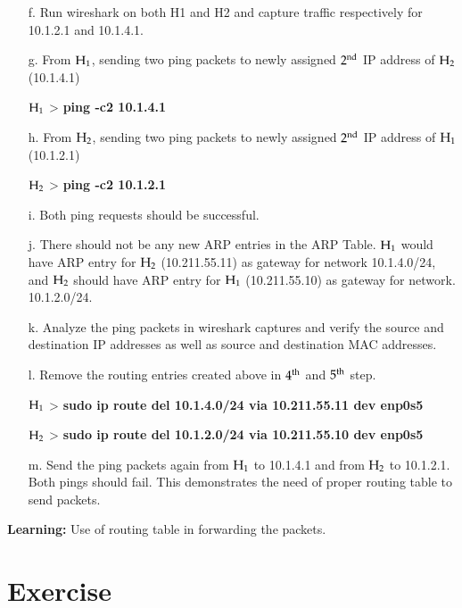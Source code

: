 \begin{multicols}{2}
\begin{itemize}
\item[f.] Run wireshark on both H1 and H2 and capture traffic respectively for 10.1.2.1 and 10.1.4.1.

\item[g.] From ${\rm H}_{1}$, sending two ping packets to newly assigned $2^{\rm nd}$ IP address of ${\rm H}_{2}$ (10.1.4.1)

${\rm H}_{1}$ > \textbf{ping -c2 10.1.4.1}


\item[h.] From ${\rm H}_{2}$, sending two ping packets to newly assigned $2^{\rm nd}$ IP address of ${\rm H}_{1}$ (10.1.2.1)

${\rm H}_{2}$ > \textbf{ping -c2 10.1.2.1}

\item[i.] Both ping requests should be successful.

\item[j.] There should not be any new ARP entries in the ARP Table. ${\rm H}_{1}$ would have ARP entry for ${\rm H}_{2}$ (10.211.55.11) as gateway for network 10.1.4.0/24, and ${\rm H}_{2}$ should have ARP entry for ${\rm H}_{1}$ (10.211.55.10) as gateway for network. 10.1.2.0/24.


\item[k.] Analyze the ping packets in wireshark captures and verify the source and destination IP addresses as well as source and destination MAC addresses.

\item[l.] Remove the routing entries created above in $4^{\rm th}$ and $5^{\rm th}$ step.

${\rm H}_{1}$ > \textbf{sudo ip route del 10.1.4.0/24 via 10.211.55.11 dev enp0s5}

${\rm H}_{2}$ > \textbf{sudo ip route del 10.1.2.0/24 via 10.211.55.10 dev enp0s5}

\item[m.] Send the ping packets again from ${\rm H}_{1}$ to 10.1.4.1 and from ${\rm H}_{2}$ to 10.1.2.1. Both pings should fail. This demonstrates the need of proper routing table to send packets.

\end{itemize}

\vspace{-.5cm}

\textbf{Learning:} Use of routing table in forwarding the packets.

\vspace{-.5cm}

\section*{Exercise \label{chap2-exe3}}


\end{multicols}

